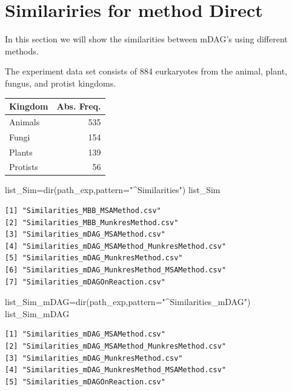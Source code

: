 \documentclass[
  letterpaper,
  DIV=11,
  numbers=noendperiod]{scrreprt}
\newenvironment{Shaded}{\begin{snugshade}}{\end{snugshade}}
\newcommand{\AttributeTok}[1]{\textcolor[rgb]{0.40,0.45,0.13}{#1}}
\newcommand{\FunctionTok}[1]{\textcolor[rgb]{0.28,0.35,0.67}{#1}}
\newcommand{\NormalTok}[1]{\textcolor[rgb]{0.00,0.23,0.31}{#1}}
\newcommand{\OtherTok}[1]{\textcolor[rgb]{0.00,0.23,0.31}{#1}}
\newcommand{\StringTok}[1]{\textcolor[rgb]{0.13,0.47,0.30}{#1}}
\begin{document}

\hypertarget{similariries-for-method-direct}{%
\chapter{Similariries for method
Direct}\label{similariries-for-method-direct}}

In this section we will show the similarities between mDAG's using
different methods.

The experiment data set consists of 884 eurkaryotes from the animal,
plant, fungus, and protist kingdoms.

\begin{tabular}{l|r}
\hline
Kingdom & Abs. Freq.\\
\hline
Animals & 535\\
\hline
Fungi & 154\\
\hline
Plants & 139\\
\hline
Protists & 56\\
\hline
\end{tabular}

\begin{Shaded}
\begin{Highlighting}[]
\NormalTok{list\_Sim}\OtherTok{=}\FunctionTok{dir}\NormalTok{(path\_exp,}\AttributeTok{pattern=}\StringTok{"\^{}Similarities"}\NormalTok{)}
\NormalTok{list\_Sim}
\end{Highlighting}
\end{Shaded}

\begin{verbatim}
[1] "Similarities_MBB_MSAMethod.csv"               
[2] "Similarities_MBB_MunkresMethod.csv"           
[3] "Similarities_mDAG_MSAMethod.csv"              
[4] "Similarities_mDAG_MSAMethod_MunkresMethod.csv"
[5] "Similarities_mDAG_MunkresMethod.csv"          
[6] "Similarities_mDAG_MunkresMethod_MSAMethod.csv"
[7] "Similarities_mDAGOnReaction.csv"              
\end{verbatim}

\begin{Shaded}
\begin{Highlighting}[]
\NormalTok{list\_Sim\_mDAG}\OtherTok{=}\FunctionTok{dir}\NormalTok{(path\_exp,}\AttributeTok{pattern=}\StringTok{"\^{}Similarities\_mDAG"}\NormalTok{)}
\NormalTok{list\_Sim\_mDAG}
\end{Highlighting}
\end{Shaded}

\begin{verbatim}
[1] "Similarities_mDAG_MSAMethod.csv"              
[2] "Similarities_mDAG_MSAMethod_MunkresMethod.csv"
[3] "Similarities_mDAG_MunkresMethod.csv"          
[4] "Similarities_mDAG_MunkresMethod_MSAMethod.csv"
[5] "Similarities_mDAGOnReaction.csv"              
\end{verbatim}
\end{document}

